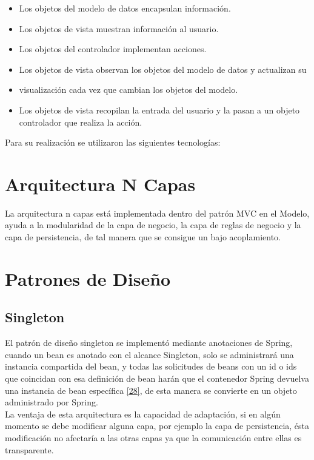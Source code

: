 \begin{itemize}
	\item Los objetos del modelo de datos encapsulan información.
	\item Los objetos de vista muestran información al usuario.
	\item Los objetos del controlador implementan acciones.
	\item Los objetos de vista observan los objetos del modelo de datos y actualizan su \item visualización cada vez que cambian los objetos del modelo.
	\item Los objetos de vista recopilan la entrada del usuario y la pasan a un objeto controlador que realiza la acción. 
\end{itemize}

Para su realización se utilizaron las siguientes tecnologías:

\section{Arquitectura N Capas}
La arquitectura n capas está implementada dentro del patrón MVC en el Modelo, ayuda a la modularidad de la capa de negocio, la capa de reglas de negocio y la capa de persistencia, de tal manera que se consigue un bajo acoplamiento.

\section{Patrones de Diseño}

\subsection{Singleton}
El patrón de diseño singleton se implementó mediante anotaciones de Spring, cuando un bean es anotado con el alcance Singleton, solo se administrará una instancia compartida del bean, y todas las solicitudes de beans con un id o ids que coincidan con esa definición de bean harán que el contenedor Spring devuelva una instancia de bean específica \hyperlink{b28}{[28]}, de esta manera se convierte en un objeto administrado por Spring.\\

La ventaja de esta arquitectura es la capacidad de adaptación, si en algún momento se debe modificar alguna capa, por ejemplo la capa de persistencia, ésta modificación no afectaría a las otras capas ya que la comunicación entre ellas es transparente.

